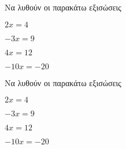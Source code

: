 Να λυθούν οι παρακάτω εξισώσεις
\begin{alist}
\item $ 2x=4 $
\item $ -3x=9 $
\item $ 4x=12 $
\item $ -10x=-20 $
\end{alist}
Να λυθούν οι παρακάτω εξισώσεις
\begin{alist}
\item $ 2x=4 $
\item $ -3x=9 $
\item $ 4x=12 $
\item $ -10x=-20 $
\end{alist}
